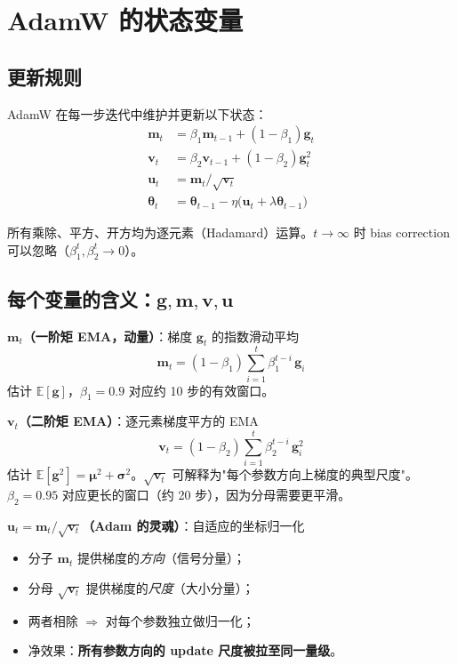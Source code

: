 \documentclass[11pt,a4paper]{ctexart}
\theoremstyle{definition}
\theoremstyle{remark}
\newcommand{\E}{\mathbb{E}}
\begin{document}
\section{AdamW 的状态变量}
 
\subsection{更新规则}
 
AdamW 在每一步迭代中维护并更新以下状态：
\begin{align}
\bm{m}_t &= \beta_1 \bm{m}_{t-1} + (1-\beta_1)\bm{g}_t \\
\bm{v}_t &= \beta_2 \bm{v}_{t-1} + (1-\beta_2)\bm{g}_t^2 \\
\bm{u}_t &= \bm{m}_t \big/ \sqrt{\bm{v}_t} \\
\bm{\theta}_t &= \bm{\theta}_{t-1} - \eta\bigl(\bm{u}_t + \lambda\bm{\theta}_{t-1}\bigr)
\end{align}
 
所有乘除、平方、开方均为逐元素（Hadamard）运算。$t\to\infty$ 时 bias correction 可以忽略（$\beta_1^t, \beta_2^t \to 0$）。
 
\subsection{\texorpdfstring{每个变量的含义：$\bm{g}, \bm{m}, \bm{v}, \bm{u}$}{每个变量的含义}}
 
\textbf{$\bm{m}_t$（一阶矩 EMA，动量）}：梯度 $\bm{g}_t$ 的指数滑动平均
\[ \bm{m}_t = (1-\beta_1)\sum_{i=1}^t \beta_1^{t-i}\, \bm{g}_i \]
估计 $\E[\bm{g}]$，$\beta_1 = 0.9$ 对应约 10 步的有效窗口。
 
\textbf{$\bm{v}_t$（二阶矩 EMA）}：逐元素梯度平方的 EMA
\[ \bm{v}_t = (1-\beta_2)\sum_{i=1}^t \beta_2^{t-i}\, \bm{g}_i^2 \]
估计 $\E[\bm{g}^2] = \bm{\mu}^2 + \bm{\sigma}^2$。$\sqrt{\bm{v}_t}$ 可解释为"每个参数方向上梯度的典型尺度"。$\beta_2 = 0.95$ 对应更长的窗口（约 20 步），因为分母需要更平滑。
 
\textbf{$\bm{u}_t = \bm{m}_t/\sqrt{\bm{v}_t}$（Adam 的灵魂）}：自适应的坐标归一化
\begin{itemize}
    \item 分子 $\bm{m}_t$ 提供梯度的\emph{方向}（信号分量）；
    \item 分母 $\sqrt{\bm{v}_t}$ 提供梯度的\emph{尺度}（大小分量）；
    \item 两者相除 $\Longrightarrow$ 对每个参数独立做归一化；
    \item 净效果：\textbf{所有参数方向的 update 尺度被拉至同一量级}。
\end{itemize}
 
\end{document}
